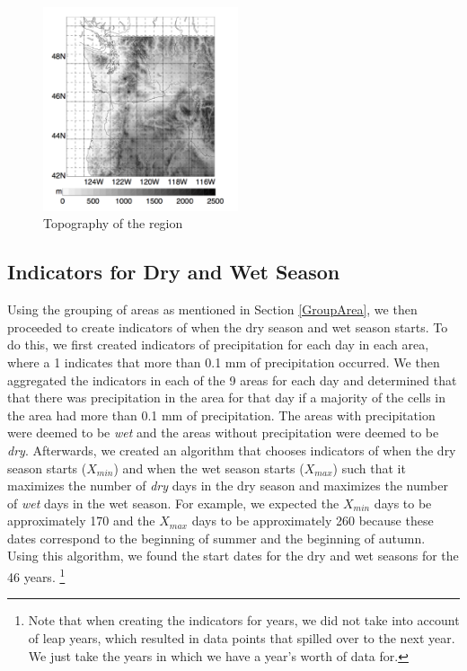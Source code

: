 \documentclass{article}
\begin{document}
\begin{figure}[h!]
\centering
\includegraphics[width = .4\textwidth, height = 6cm]{topography}
\caption{Topography of the region }
\label{fig:area4}
\end{figure}

\subsection{Indicators for Dry and Wet Season}
Using the grouping of areas as mentioned in Section \ref{GroupArea}, we then proceeded to create indicators of when the dry season and wet season starts. To do this, we first created indicators of precipitation for each day in each area, where a 1 indicates that more than 0.1 mm of precipitation occurred.  We then aggregated the indicators in each of the 9 areas for each day and determined that that there was precipitation in the area for that day if a majority of the cells in the area had more than 0.1 mm of precipitation. The areas with precipitation were deemed to be \textit{wet} and the areas without precipitation were deemed to be \textit{dry}. Afterwards, we created an algorithm that chooses indicators of when the dry season starts ($X_{min}$) and when the wet season starts ($X_{max}$) such that it maximizes the number of \textit{dry} days in the dry season and maximizes the number of \textit{wet} days in the wet season. For example, we expected the $X_{min}$ days to be approximately 170 and the $X_{max}$ days to be approximately 260 because these dates correspond to the beginning of summer and the beginning of autumn. Using this algorithm, we found the start dates for the dry and wet seasons for the 46 years. \footnote{Note that when creating the indicators for years, we did not take into account of leap years, which resulted in data points that spilled over to the next year. We just take the years in which we have a year's worth of data for.}
\end{document}
